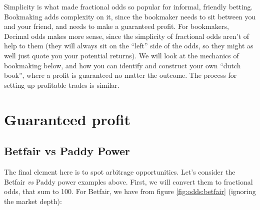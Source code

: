 \documentclass[a4paper]{article}
\begin{document}
Simplicity is what made fractional odds so popular for informal, friendly betting.
Bookmaking adds complexity on it, since the bookmaker needs to sit between you and your friend, and needs to make a guaranteed profit.
For bookmakers, Decimal odds makes more sense, since the simplicity of fractional odds aren't of help to them (they will always sit on the ``left'' side of the odds, so they might as well just quote you your potential returns).
We will look at the mechanics of bookmaking below, and how you can identify and construct your own ``dutch book'', where a profit is guaranteed no matter the outcome.
The process for setting up profitable trades is similar.

\section{Guaranteed profit}
\subsection{Betfair vs Paddy Power}

The final element here is to spot arbitrage opportunities.
Let's consider the Betfair \emph{vs} Paddy power examples above.
First, we will convert them to fractional odds, that sum to 100.
For Betfair, we have from figure \ref{fig:odds:betfair} (ignoring the market depth):
\end{document}
